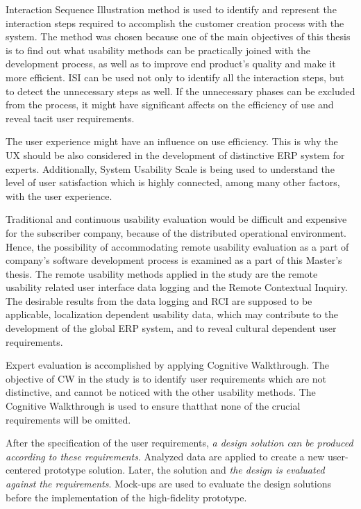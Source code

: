 \documentclass[12pt,a4paper,oneside,pdftex]{report}
\begin{document}
Interaction Sequence Illustration method is used to identify and represent the interaction steps required to accomplish the customer creation process with the system. The method was chosen because one of the main objectives of this thesis is to find out what usability methods can be practically joined with the development process, as well as to improve end product's quality and make it more efficient. ISI can be used not only to identify all the interaction steps, but to detect the unnecessary steps as well. If the unnecessary phases can be excluded from the process, it might have significant affects on the efficiency of use and reveal tacit user requirements. 

The user experience might have an influence on use efficiency. This is why the UX should be also considered in the development of distinctive ERP system for experts. Additionally, System Usability Scale is being used to understand the level of user satisfaction which is highly connected, among many other factors, with the user experience.

Traditional and continuous usability evaluation would be difficult and expensive for the subscriber company, because of the distributed operational environment. Hence, the possibility of accommodating remote usability evaluation as a part of company's software development process is examined as a part of this Master's thesis. The remote usability methods applied in the study are the remote usability related user interface data logging and the Remote Contextual Inquiry. The desirable results from the data logging and RCI are supposed to be applicable, localization dependent usability data, which may contribute to the development of the global ERP system, and to reveal cultural dependent user requirements. 

Expert evaluation is accomplished by applying Cognitive Walkthrough. The objective of CW in the study is to identify user requirements which are not distinctive, and cannot be noticed with the other usability methods. The Cognitive Walkthrough is used to ensure thatthat none of the crucial requirements will be omitted.

After the specification of the user requirements, \emph{a design solution can be produced according to these requirements}. Analyzed data are applied to create a new user-centered prototype solution. Later, the solution and \emph{the design is evaluated against the requirements}. Mock-ups are used to evaluate the design solutions before the implementation of the high-fidelity prototype.
\end{document}
